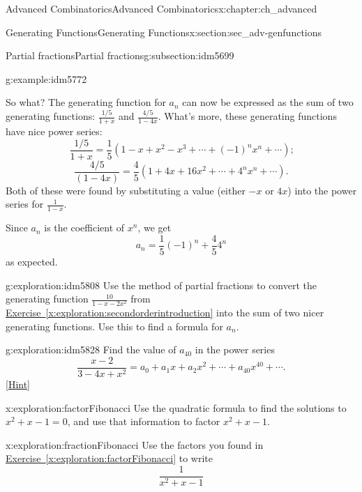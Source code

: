 \documentclass[oneside,10pt,]{book}
\numberwithin{equation}{chapter}
\begin{document}
\begin{chapterptx}{Advanced Combinatorics}{}{Advanced Combinatorics}{}{}{x:chapter:ch_advanced}
\begin{sectionptx}{Generating Functions}{}{Generating Functions}{}{}{x:section:sec_adv-genfunctions}
\begin{subsectionptx}{Partial fractions}{}{Partial fractions}{}{}{g:subsection:idm5699}
\begin{example}{}{g:example:idm5772}
\par
So what?  The generating function for \(a_n\) can now be expressed as the sum of two generating functions: \(\frac{1/5}{1+x}\) and \(\frac{4/5}{1-4x}\).  What's more, these generating functions have nice power series:%
\begin{equation*}
\frac{1/5}{1+x} = \frac{1}{5}\left( 1-x+x^2-x^3+\cdots +(-1)^nx^n+\cdots\right)\text{;}
\end{equation*}
%
\begin{equation*}
\frac{4/5}{(1-4x)} = \frac{4}{5} \left(1+4x + 16x^2 + \cdots + 4^nx^n+ \cdots \right)\text{.}
\end{equation*}
Both of these were found by substituting a value (either \(-x\) or \(4x\)) into the power series for \(\frac{1}{1-x}\).%
\par
Since \(a_n\) is the coefficient of \(x^n\), we get%
\begin{equation*}
a_n = \frac{1}{5}(-1)^n + \frac{4}{5}4^n
\end{equation*}
as expected.%
\end{example}
\begin{exploration}{}{g:exploration:idm5808}%
Use the method of partial fractions to convert the generating function \(\frac{10}{1-x-2x^2}\) from \hyperref[x:exploration:secondorderintroduction]{Exercise~\ref{x:exploration:secondorderintroduction}} into the sum of two nicer generating functions. Use this to find a formula for \(a_n\).%
\end{exploration}
\begin{exploration}{}{g:exploration:idm5828}%
Find the value of \(a_{40}\) in the power series%
\begin{equation*}
\frac{x-2}{3-4x +x^2} = a_0 + a_1x + a_2x^2 + \cdots + a_{40}x^{40}+\cdots.
\end{equation*}
%
\space\hspace*{0pt}\hfill{\tiny\hyperlink{g:hint:idm5833-back}{[Hint]}}\end{exploration}
\begin{exploration}{}{x:exploration:factorFibonacci}%
Use the quadratic formula to find the solutions to \(x^2+x-1=0\), and use that information to factor \(x^2+x-1\).%
\end{exploration}
\begin{exploration}{}{x:exploration:fractionFibonacci}%
Use the factors you found in \hyperref[x:exploration:factorFibonacci]{Exercise~\ref{x:exploration:factorFibonacci}} to write%
\begin{equation*}
\frac{1}{x^2+x-1}

\end{equation*}
\end{exploration}
\end{subsectionptx}
\end{sectionptx}
\end{chapterptx}
\end{document}
